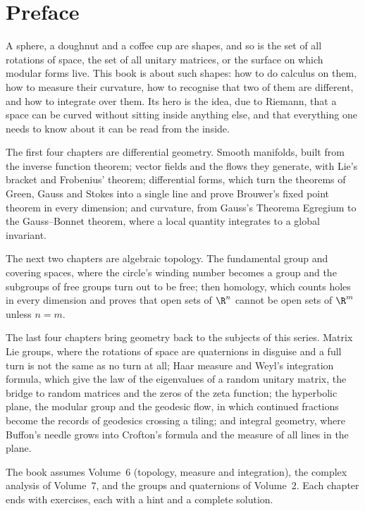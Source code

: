 \chapter*{Preface}
A sphere, a doughnut and a coffee cup are shapes, and so is the set of all rotations of space, the set of all unitary matrices, or the
surface on which modular forms live. This book is about such shapes: how to do calculus on them, how to measure their curvature, how to
recognise that two of them are different, and how to integrate over them. Its hero is the idea, due to Riemann, that a space can be
curved without sitting inside anything else, and that everything one needs to know about it can be read from the inside.

The first four chapters are differential geometry. Smooth manifolds, built from the inverse function theorem; vector fields and the
flows they generate, with Lie's bracket and Frobenius' theorem; differential forms, which turn the theorems of Green, Gauss and Stokes
into a single line and prove Brouwer's fixed point theorem in every dimension; and curvature, from Gauss's Theorema Egregium to the
Gauss--Bonnet theorem, where a local quantity integrates to a global invariant.

The next two chapters are algebraic topology. The fundamental group and covering spaces, where the circle's winding number becomes a
group and the subgroups of free groups turn out to be free; then homology, which counts holes in every dimension and proves that
open sets of $\R^n$ cannot be open sets of $\R^m$ unless $n=m$.

The last four chapters bring geometry back to the subjects of this series. Matrix Lie groups, where the rotations of space are
quaternions in disguise and a full turn is not the same as no turn at all; Haar measure and Weyl's integration formula, which give
the law of the eigenvalues of a random unitary matrix, the bridge to random matrices and the zeros of the zeta function; the
hyperbolic plane, the modular group and the geodesic flow, in which continued fractions become the records of geodesics crossing a tiling; and integral
geometry, where Buffon's needle grows into Crofton's formula and the measure of all lines in the plane.

The book assumes Volume~6 (topology, measure and integration), the complex analysis of Volume~7, and the groups and quaternions of
Volume~2. Each chapter ends with exercises, each with a hint and a complete solution.
